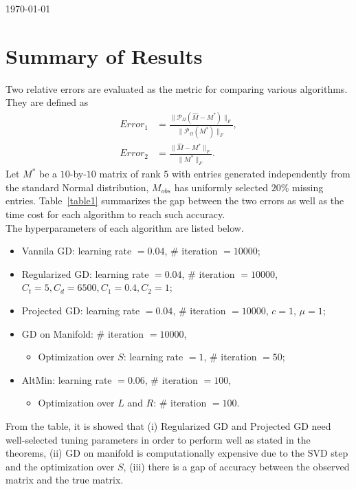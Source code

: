 \documentclass[12pt]{article}%
\begin{document}
\noindent\today

\section*{Summary of Results}
Two relative errors are evaluated as the metric for comparing various algorithms. They are defined as
\begin{align*}
Error_1 &= \frac{\|\mathcal{P}_\Omega(\hat M-M^*)\|_F}{\|\mathcal{P}_\Omega(M^*)\|_F},\\
Error_2 &= \frac{\|\hat M-M^*\|_F}{\|M^*\|_F}.
\end{align*}
Let $M^*$ be a $10$-by-$10$ matrix of rank $5$ with entries generated independently from the standard Normal distribution,  $M_{obs}$ has uniformly selected $20\%$ missing entries.
Table~\ref{table1} summarizes the gap between the two errors as well as the time cost for each algorithm to reach such accuracy. 
\\
The hyperparameters of each algorithm are listed below.
\begin{itemize}
	\item Vannila GD: learning rate $=0.04$, \# iteration $=10000$;
	\item Regularized GD: learning rate $=0.04$, \# iteration $=10000$, $C_t = 5, C_d = 6500, C_1 = 0.4, C_2 = 1$;
	\item Projected GD: learning rate $=0.04$, \# iteration $=10000$, $c = 1$, $\mu = 1$;
	\item GD on Manifold: \# iteration $=10000$,
		\begin{itemize}
			\item Optimization over $S$: learning rate $=1$, \# iteration $=50$;
		\end{itemize}
	\item AltMin: learning rate $=0.06$, \# iteration $=100$,
		\begin{itemize}
			\item Optimization over $L$ and $R$: \# iteration $=100$.
		\end{itemize}
		
		
\end{itemize}
\noindent
From the table, it is showed that (i) Regularized GD and Projected GD need well-selected tuning parameters in order to perform well as stated in the theorems, (ii) GD on manifold is computationally expensive due to the SVD step and  the optimization over $S$, (iii) there is a gap of accuracy between the observed matrix and the true matrix.
\end{document}
